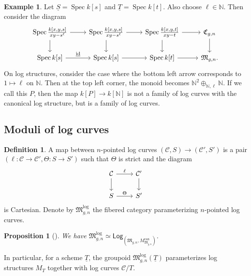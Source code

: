 \documentclass{amsart}
\newtheorem{prop}[thm]{Proposition}
\theoremstyle{definition}
\newtheorem{defn}[thm]{Definition}
\newtheorem{exm}[thm]{Example}
\theoremstyle{remark}
\theoremstyle{plain}
\theoremstyle{definition}
\theoremstyle{remark}
\newcommand{\N}{\mathbb{N}}
\newcommand{\mc}[1]{\mathcal{#1}}
\newcommand{\mf}[1]{\mathfrak{#1}}
\newcommand{\on}[1]{\operatorname{#1}}
\newcommand{\ms}[1]{\mathsf{#1}}
\newcommand{\ul}[1]{\underline{#1}}
\newcommand{\1}{\mathbf{1}}
\newcommand{\2}{\mathbf{2}}
\newcommand{\3}{\mathbf{3}}
\DeclareMathOperator{\Spec}{Spec}
\begin{document}
\begin{exm}
    Let \(\ul{S} = \Spec k[s]\) and \(\ul{T} = \Spec k[t]\). Also choose \(\ell \in \N\). Then consider the diagram
    \begin{equation*}
    \begin{tikzcd}
        \Spec \frac{k{ [x,y,s] }}{xy-s^{\ell}} \ar{d} \ar{r} & \Spec \frac{k{ [x,y,s] }}{xy-s^{\ell}} \ar{d} \ar{r} & \Spec  \frac{k{[x,y,t]}}{xy-t} \ar{r}\ar{d} & \mf{C}_{g,n} \ar{d} \\
        \Spec k{[s]} \ar{r}{\ul{ \on{id} }} & \Spec {k[s]} \ar{r} & \Spec k{[t]} \ar{r} & \mf{M}_{g,n}.
    \end{tikzcd}
    \end{equation*}
    On log structures, consider the case where the bottom left arrow corresponds to \(1 \mapsto \ell\) on \(\N\). Then at the top left corner, the monoid becomes \(\N^2 \oplus_{\N, \ell} \N\). If we call this \(P\), then the map \(k[P] \to k[\N]\) is not a family of log curves with the canonical log structure, but is a family of log curves.
\end{exm}

\subsection{Moduli of log curves}%
\label{sub:Moduli of log curves}

\begin{defn}
    A map between \(n\)-pointed log curves \((\mc{C}, S) \to (\mc{C}', S')\) is a pair \((\ell \colon \mc{C} \to \mc{C}', \Theta \colon S \to S')\) such that \(\Theta\) is strict and the diagram
    \begin{equation*}
    \begin{tikzcd}
        \mc{C} \ar{d} \ar{r}{\ell} & \mc{C}' \ar{d} \\
        S \ar{r}{\Theta} & S'
    \end{tikzcd}
    \end{equation*}
    is Cartesian. Denote by \(\mf{M}_{g,n}^{\log}\) the fibered category parameterizing \(n\)-pointed log curves.
\end{defn}

\begin{prop}[{\cite{FKato2000,Olsson2003}}]
    We have \(\mf{M}_{g,n}^{\log} \simeq \ms{Log}_{(\mf{M}_{g,n}, M_{\mf{M}_{g,n}}^{\on{can}})}\).
\end{prop}

In particular, for a scheme \(\ul{T}\), the groupoid \(\mf{M}_{g,n}^{\log}(\ul{T})\) parameterizes log structures \(M_T\) together with log curves \(\mc{C} / T\).
\end{document}
